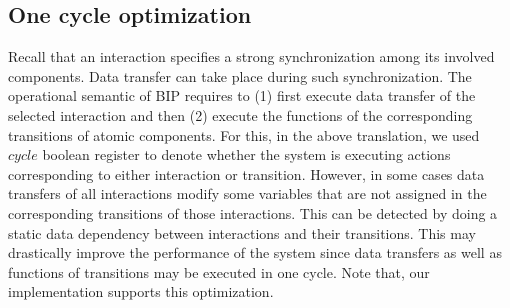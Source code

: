 




\subsection{One cycle optimization}
Recall that an interaction specifies a strong synchronization among its involved components. Data transfer can take place during such synchronization. The operational semantic of BIP requires to (1) first execute data transfer of the selected interaction and then (2) execute the functions of the corresponding transitions of atomic components. For this, in the above translation, we used $cycle$ boolean register to denote whether the system is executing actions corresponding to either interaction or transition. However, in some cases data transfers of all interactions modify some variables that are not assigned in the corresponding transitions of those interactions. This can be detected by doing a static data dependency between interactions and their transitions. 
This may drastically improve the performance of the system since data transfers as well as functions of transitions may be executed in one cycle. Note that, our implementation supports this optimization.   

